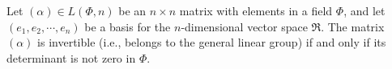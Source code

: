 Let $(\alpha) \in L(\Phi, n)$ be an $n \times n$ matrix with elements in a field $\Phi$, and let $(e_1, e_2, \cdots, e_n)$ be a basis for the $n$-dimensional vector space $\Re$. The matrix $(\alpha)$ is invertible (i.e., belongs to the general linear group) if and only if its determinant is not zero in $\Phi$.
